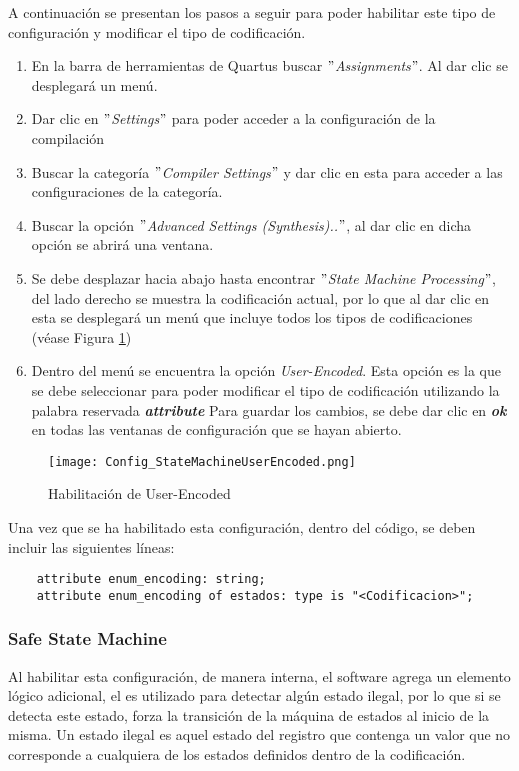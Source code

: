 \documentclass{article}
\begin{document}
A continuación se presentan los pasos a seguir para poder habilitar este tipo de configuración y modificar el tipo de codificación.
\begin{enumerate}
    \item En la barra de herramientas de Quartus buscar \textit{$"$Assignments$"$}. Al dar clic se desplegará un menú.
    \item Dar clic en \textit{$"$Settings$"$} para poder acceder a la configuración de la compilación
    \item Buscar la categoría \textit{$"$Compiler Settings$"$} y dar clic en esta para acceder a las configuraciones de la categoría.
    \item Buscar la opción \textit{$"$Advanced Settings (Synthesis)..$"$}, al dar clic en dicha opción se abrirá una ventana.
    \item Se debe desplazar hacia abajo hasta encontrar \textit{$"$State Machine Processing$"$}, del lado derecho se muestra la codificación actual, por lo que al dar clic en esta se desplegará un menú que incluye todos los tipos de codificaciones (véase Figura \ref{fig:Config_StateMachineUserEncoded})
    \item Dentro del menú se encuentra la opción \textit{User-Encoded}. Esta opción es la que se debe seleccionar para poder modificar el tipo de codificación utilizando la palabra reservada \textbf{\textit{attribute}} Para guardar los cambios, se debe dar clic en \textbf{\textit{ok}} en todas las ventanas de configuración que se hayan abierto.
\end{enumerate}
\begin{figure}[h!]
        \centering
        \texttt{[image: Config\_StateMachineUserEncoded.png]}
        \caption{\label{fig:Config_StateMachineUserEncoded}Habilitación de User-Encoded}
    \end{figure}
Una vez que se ha habilitado esta configuración, dentro del código, se deben incluir las siguientes líneas:
\begin{lstlisting}
    attribute enum_encoding: string;
    attribute enum_encoding of estados: type is "<Codificacion>";
\end{lstlisting}
\subsubsection{Safe State Machine}
Al habilitar esta configuración, de manera interna, el software agrega un elemento lógico adicional, el es utilizado para detectar algún estado ilegal, por lo que si se detecta este estado, forza la transición de la máquina de estados al inicio de la misma. 
Un estado ilegal es aquel estado del registro que contenga un valor que no corresponde a cualquiera de los estados definidos dentro de la codificación.
\end{document}
